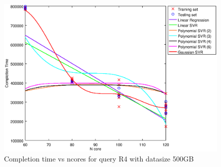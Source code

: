 
\begin {figure}[hbtp]
\centering
\includegraphics[width=\textwidth]{output/R4_500_ONLY_1_LINEAR_NCORE/plot_R4_500.eps}
\caption{Completion time vs ncores for query R4 with datasize 500GB}
\label{fig:only_1_linear_R4_500}
\end {figure}

